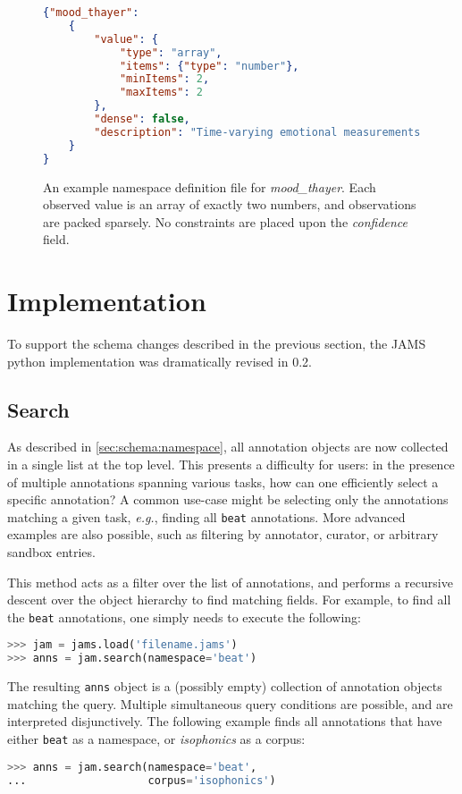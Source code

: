 \documentclass{article}
\begin{document}
\begin{figure}
    \begin{lstlisting}[language=json,title={mood\_thayer.json}]
{"mood_thayer":
    {
        "value": {
            "type": "array",
            "items": {"type": "number"},
            "minItems": 2,
            "maxItems": 2
        },
        "dense": false,
        "description": "Time-varying emotional measurements as ordered pairs of (valence, arousal)"
    }
}
\end{lstlisting}
\caption{An example namespace definition file for \emph{mood\_thayer}.  Each observed
value is an array of exactly two numbers, and observations are packed sparsely.  No
constraints are placed upon the \emph{confidence} field.\label{fig:thayer}}
\end{figure}


\section{Implementation}\label{sec:implementation}

To support the schema changes described in the previous section, the JAMS python 
implementation was dramatically revised in 0.2.

\subsection{Search}\label{sec:imp:search}
As described in \ref{sec:schema:namespace}, all annotation objects are now collected in a
single list at the top level.  This presents a difficulty for users: in the presence of
multiple annotations spanning various tasks, how can one efficiently select a specific
annotation?  A common use-case might be selecting only the annotations matching a given
task, \emph{e.g.}, finding all \texttt{beat} annotations.  More advanced
examples are also possible, such as filtering by annotator, curator, or arbitrary
sandbox entries.

This method acts as a filter over the list of annotations, and performs a recursive
descent over the object hierarchy to find matching fields.  For example, to find all the
\texttt{beat} annotations, one simply needs to execute the following:
\begin{lstlisting}[language=python]
>>> jam = jams.load('filename.jams')
>>> anns = jam.search(namespace='beat')
\end{lstlisting}
The resulting \texttt{anns} object is a (possibly empty) collection of annotation objects
matching the query.  Multiple simultaneous query conditions are possible, and are 
interpreted disjunctively.
The following example finds all annotations that have either
\texttt{beat} as a namespace, or \emph{isophonics} as a corpus:
\begin{lstlisting}[language=python]
>>> anns = jam.search(namespace='beat',
...                   corpus='isophonics')
\end{lstlisting}
\end{document}
